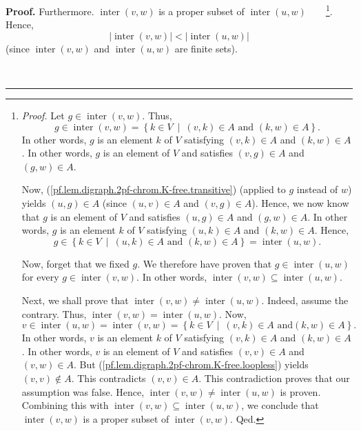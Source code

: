 \documentclass[numbers=enddot,12pt,final,onecolumn,notitlepage]{scrartcl}%
\theoremstyle{definition}
\newenvironment{proof}[1][Proof]{\noindent\textbf{#1.} }{\ \rule{0.5em}{0.5em}}
\newenvironment{verlong}{}{}
\begin{document}
\begin{verlong}
\begin{proof}
Furthermore. $\operatorname*{inter}\left(  v,w\right)  $ is a proper subset of
$\operatorname*{inter}\left(  u,w\right)  $\ \ \ \ \footnote{\textit{Proof.}
Let $g\in\operatorname*{inter}\left(  v,w\right)  $. Thus,%
\[
g\in\operatorname*{inter}\left(  v,w\right)  =\left\{  k\in V\ \mid\ \left(
v,k\right)  \in A\text{ and }\left(  k,w\right)  \in A\right\}  .
\]
In other words, $g$ is an element $k$ of $V$ satisfying $\left(  v,k\right)
\in A$ and $\left(  k,w\right)  \in A$. In other words, $g$ is an element of
$V$ and satisfies $\left(  v,g\right)  \in A$ and $\left(  g,w\right)  \in A$.
\par
Now, (\ref{pf.lem.digraph.2pf-chrom.K-free.transitive}) (applied to $g$
instead of $w$) yields $\left(  u,g\right)  \in A$ (since $\left(  u,v\right)
\in A$ and $\left(  v,g\right)  \in A$). Hence, we now know that $g$ is an
element of $V$ and satisfies $\left(  u,g\right)  \in A$ and $\left(
g,w\right)  \in A$. In other words, $g$ is an element $k$ of $V$ satisfying
$\left(  u,k\right)  \in A$ and $\left(  k,w\right)  \in A$. Hence,%
\[
g\in\left\{  k\in V\ \mid\ \left(  u,k\right)  \in A\text{ and }\left(
k,w\right)  \in A\right\}  =\operatorname*{inter}\left(  u,w\right)  .
\]
\par
Now, forget that we fixed $g$. We therefore have proven that $g\in
\operatorname*{inter}\left(  u,w\right)  $ for every $g\in
\operatorname*{inter}\left(  v,w\right)  $. In other words,
$\operatorname*{inter}\left(  v,w\right)  \subseteq\operatorname*{inter}%
\left(  u,w\right)  $.
\par
Next, we shall prove that $\operatorname*{inter}\left(  v,w\right)
\neq\operatorname*{inter}\left(  u,w\right)  $. Indeed, assume the contrary.
Thus, $\operatorname*{inter}\left(  v,w\right)  =\operatorname*{inter}\left(
u,w\right)  $. Now,%
\[
v\in\operatorname*{inter}\left(  u,w\right)  =\operatorname*{inter}\left(
v,w\right)  =\left\{  k\in V\ \mid\ \left(  v,k\right)  \in A\text{ and
}\left(  k,w\right)  \in A\right\}  .
\]
In other words, $v$ is an element $k$ of $V$ satisfying $\left(  v,k\right)
\in A$ and $\left(  k,w\right)  \in A$. In other words, $v$ is an element of
$V$ and satisfies $\left(  v,v\right)  \in A$ and $\left(  v,w\right)  \in A$.
But (\ref{pf.lem.digraph.2pf-chrom.K-free.loopless}) yields $\left(
v,v\right)  \notin A$. This contradicts $\left(  v,v\right)  \in A$. This
contradiction proves that our assumption was false. Hence,
$\operatorname*{inter}\left(  v,w\right)  \neq\operatorname*{inter}\left(
u,w\right)  $ is proven. Combining this with $\operatorname*{inter}\left(
v,w\right)  \subseteq\operatorname*{inter}\left(  u,w\right)  $, we conclude
that $\operatorname*{inter}\left(  v,w\right)  $ is a proper subset of
$\operatorname*{inter}\left(  v,w\right)  $. Qed.}. Hence,
\begin{equation}
\left\vert \operatorname*{inter}\left(  v,w\right)  \right\vert <\left\vert
\operatorname*{inter}\left(  u,w\right)  \right\vert
\label{pf.lem.digraph.2pf-chrom.K-free.c.ieq2}%
\end{equation}
(since $\operatorname*{inter}\left(  v,w\right)  $ and $\operatorname*{inter}%
\left(  u,w\right)  $ are finite sets).


\end{proof}
\end{verlong}
\end{document}
